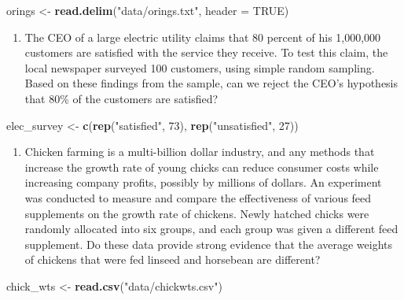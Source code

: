 \documentclass[]{article}
\newenvironment{Shaded}{\begin{snugshade}}{\end{snugshade}}
\newcommand{\KeywordTok}[1]{\textcolor[rgb]{0.13,0.29,0.53}{\textbf{{#1}}}}
\newcommand{\DataTypeTok}[1]{\textcolor[rgb]{0.13,0.29,0.53}{{#1}}}
\newcommand{\DecValTok}[1]{\textcolor[rgb]{0.00,0.00,0.81}{{#1}}}
\newcommand{\StringTok}[1]{\textcolor[rgb]{0.31,0.60,0.02}{{#1}}}
\newcommand{\OtherTok}[1]{\textcolor[rgb]{0.56,0.35,0.01}{{#1}}}
\newcommand{\NormalTok}[1]{{#1}}
\providecommand{\tightlist}{%
  \setlength{\itemsep}{0pt}\setlength{\parskip}{0pt}}
\begin{document}
\begin{Shaded}
\begin{Highlighting}[]
\NormalTok{orings <-}\StringTok{ }\KeywordTok{read.delim}\NormalTok{(}\StringTok{"data/orings.txt"}\NormalTok{, }\DataTypeTok{header =} \OtherTok{TRUE}\NormalTok{)}
\end{Highlighting}
\end{Shaded}

\begin{enumerate}
\def\labelenumi{\arabic{enumi}.}
\setcounter{enumi}{6}
\tightlist
\item
  The CEO of a large electric utility claims that 80 percent of his
  1,000,000 customers are satisfied with the service they receive. To
  test this claim, the local newspaper surveyed 100 customers, using
  simple random sampling. Based on these findings from the sample, can
  we reject the CEO's hypothesis that 80\% of the customers are
  satisfied?
\end{enumerate}

\begin{Shaded}
\begin{Highlighting}[]
\NormalTok{elec_survey <-}\StringTok{ }\KeywordTok{c}\NormalTok{(}\KeywordTok{rep}\NormalTok{(}\StringTok{"satisfied"}\NormalTok{, }\DecValTok{73}\NormalTok{), }\KeywordTok{rep}\NormalTok{(}\StringTok{"unsatisfied"}\NormalTok{, }\DecValTok{27}\NormalTok{))}
\end{Highlighting}
\end{Shaded}

\begin{enumerate}
\def\labelenumi{\arabic{enumi}.}
\setcounter{enumi}{7}
\tightlist
\item
  Chicken farming is a multi-billion dollar industry, and any methods
  that increase the growth rate of young chicks can reduce consumer
  costs while increasing company profits, possibly by millions of
  dollars. An experiment was conducted to measure and compare the
  effectiveness of various feed supplements on the growth rate of
  chickens. Newly hatched chicks were randomly allocated into six
  groups, and each group was given a different feed supplement. Do these
  data provide strong evidence that the average weights of chickens that
  were fed linseed and horsebean are different?
\end{enumerate}

\begin{Shaded}
\begin{Highlighting}[]
\NormalTok{chick_wts <-}\StringTok{ }\KeywordTok{read.csv}\NormalTok{(}\StringTok{"data/chickwts.csv"}\NormalTok{)}
\end{Highlighting}
\end{Shaded}
\end{document}
